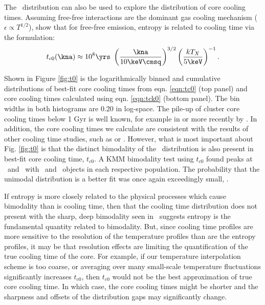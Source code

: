 \documentclass{emulateapj}
\begin{document}
The \kna\ distribution can also be used to explore the distribution of
core cooling times. Assuming free-free interactions are the dominant
gas cooling mechanism (\ie\ $\epsilon \propto T^{1/2}$),
\citet{radioquiet} show that for free-free emission, entropy is
related to cooling time via the formulation:
\begin{equation}
t_{c0}(\kna) \approx 10^8 \yrs\ \left(\frac{\kna}{10 \keV \cmsq}\right)^{3/2} \left(\frac{kT_X}{5 \keV}\right)^{-1}.
\label{eqn:tck0}
\end{equation}

Shown in Figure \ref{fig:t0} is the logarithmically binned and
cumulative distributions of best-fit core cooling times from
eqn. \ref{eqn:tc0} (top panel) and core cooling times calculated using
eqn. \ref{eqn:tck0} (bottom panel). The bin widths in both histograms
are 0.20 in log-space. The pile-up of cluster core cooling times below
1 Gyr is well known, for example in \citet{hu85} or more recently by
\citet{dunn08}. In addition, the core cooling times we calculate are
consistent with the results of other cooling time studies, such as
\citet{1998MNRAS.298..416P} or \citet{2008arXiv0802.1864R}. However,
what is most important about Fig. \ref{fig:t0} is that the distinct
bimodality of the \kna\ distribution is also present in best-fit core
cooling time, $t_{c0}$. A KMM bimodality test using $t_{c0}$ found
peaks at \tckmma\ and \tckmmb\ with \tckmmc\ and \tckmmd\ objects in
each respective population. The probability that the unimodal
distribution is a better fit was once again exceedingly small,
\tckmme.

If entropy is more closely related to the physical processes which
cause bimodality than is cooling time, then that the cooling time
distribution does not present with the sharp, deep bimodality seen in
\kna\ suggests entropy is the fundamental quantity related to
bimodality. But, since cooling time profiles are more sensitive to the
resolution of the temperature profiles than are the entropy profiles,
it may be that resolution effects are limiting the quantification of
the true cooling time of the core. For example, if our temperature
interpolation scheme is too coarse, or averaging over many small-scale
temperature fluctuations significantly increases $t_{c0}$, then
$t_{c0}$ would not be the best approximation of true core cooling
time. In which case, the core cooling times might be shorter and the
sharpness and offsets of the distribution gaps may significantly
change.

\end{document}
